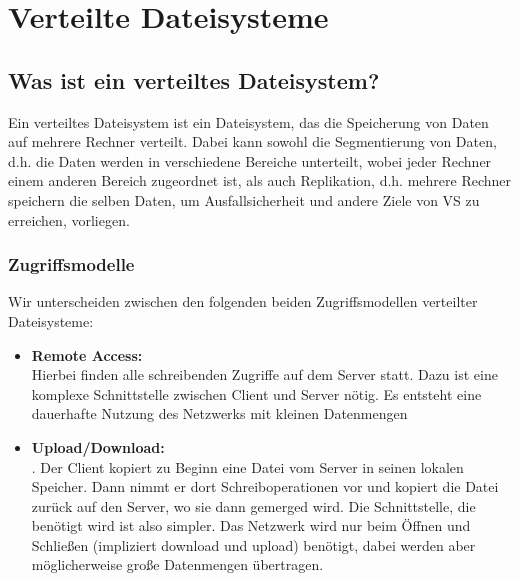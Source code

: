 \section{Verteilte Dateisysteme}

\subsection{Was ist ein verteiltes Dateisystem?}

Ein verteiltes Dateisystem ist ein Dateisystem, das die Speicherung von Daten auf mehrere Rechner verteilt. Dabei kann sowohl die Segmentierung von Daten, d.h. die Daten werden in verschiedene Bereiche unterteilt, wobei jeder Rechner einem anderen Bereich zugeordnet ist, als auch Replikation, d.h. mehrere Rechner speichern die selben Daten, um Ausfallsicherheit und andere Ziele von VS zu erreichen, vorliegen.

\subsubsection{Zugriffsmodelle}
\label{sec:zugriffsmodelle}
Wir unterscheiden zwischen den folgenden beiden Zugriffsmodellen verteilter Dateisysteme:
\begin{itemize}
    \item \textbf{Remote Access:}\\
          Hierbei finden alle schreibenden Zugriffe auf dem Server statt. Dazu ist eine komplexe Schnittstelle zwischen Client und Server nötig. Es entsteht eine dauerhafte Nutzung des Netzwerks mit kleinen Datenmengen
    \item \textbf{Upload/Download:}\\.
          Der Client kopiert zu Beginn eine Datei vom Server in seinen lokalen Speicher. Dann nimmt er dort Schreiboperationen vor und kopiert die Datei zurück auf den Server, wo sie dann gemerged wird. Die Schnittstelle, die benötigt wird ist also simpler. Das Netzwerk wird nur beim Öffnen und Schließen (impliziert download und upload) benötigt, dabei werden aber möglicherweise große Datenmengen übertragen.
\end{itemize}


